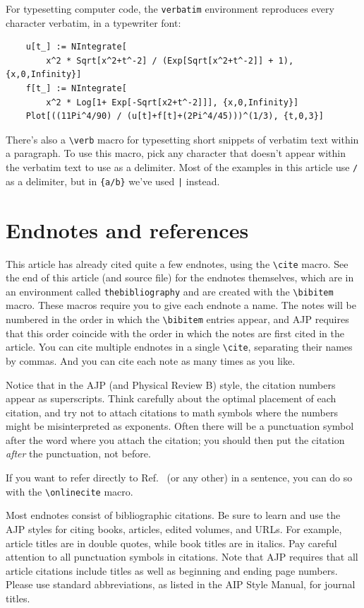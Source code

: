 \documentclass[prb,preprint]{revtex4-1}
\begin{document}
For typesetting computer code, the \texttt{verbatim} environment reproduces
every character verbatim, in a typewriter font:
\begin{verbatim}
    u[t_] := NIntegrate[
        x^2 * Sqrt[x^2+t^-2] / (Exp[Sqrt[x^2+t^-2]] + 1), {x,0,Infinity}]
    f[t_] := NIntegrate[
        x^2 * Log[1+ Exp[-Sqrt[x2+t^-2]]], {x,0,Infinity}]
    Plot[((11Pi^4/90) / (u[t]+f[t]+(2Pi^4/45)))^(1/3), {t,0,3}]
\end{verbatim}
There's also a \verb/\verb/ macro for typesetting short snippets of verbatim
text within a paragraph. To use this macro, pick any character that doesn't
appear within the verbatim text to use as a delimiter. Most of the examples
in this article use \texttt{/} as a delimiter, but in \verb|{a/b}| we've used
\verb/|/ instead.


\section{Endnotes and references}

This article has already cited quite a few endnotes, using the \verb/\cite/
macro. See the end of this article (and source file) for the endnotes
themselves, which are in an environment called \texttt{thebibliography}
and are created with the \verb/\bibitem/ macro.  These macros require
you to give each endnote a name.  The notes will be numbered in the
order in which the \verb/\bibitem/ entries appear, and AJP requires that
this order coincide with the order in which the notes are first cited in 
the article.  You can cite multiple endnotes in a single \verb/\cite/, 
separating their names by commas.  And you can cite each note as many 
times as you like.

Notice that in the AJP (and Physical Review B) style, the citation numbers 
appear as superscripts. Think carefully about the optimal placement of
each citation, and try not to attach citations to math symbols where the
numbers might be misinterpreted as exponents. Often there will be a
punctuation symbol after the word where you attach the citation; you
should then put the citation \textit{after} the punctuation, not 
before.\cite{nevermindlogic}

If you want to refer directly to Ref.~ (or any other) 
in a sentence, you can do so with the \verb/\onlinecite/ macro.

Most endnotes consist of bibliographic citations.\cite{noBIBTeX}  Be sure 
to learn and use the AJP styles for citing books,\cite{latexbook} 
articles,\cite{dyson} edited volumes,\cite{examplevolume} and
URLs.\cite{latexsite}  For example, article titles are in double quotes, 
while book titles are in italics. Pay careful attention to all punctuation 
symbols in citations.  Note that AJP requires that all article citations 
include titles as well as beginning and ending page numbers.
Please use standard abbreviations, as listed in the AIP Style 
Manual,\cite{AIPstylemanual} for journal titles.
\end{document}
